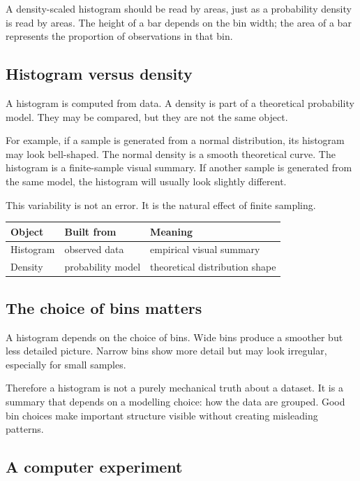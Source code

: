 \begin{remarkbox}
A density-scaled histogram should be read by areas, just as a probability density
is read by areas. The height of a bar depends on the bin width; the area of a bar
represents the proportion of observations in that bin.
\end{remarkbox}

\subsection*{Histogram versus density}

A histogram is computed from data. A density is part of a theoretical probability
model. They may be compared, but they are not the same object.

For example, if a sample is generated from a normal distribution, its histogram
may look bell-shaped. The normal density is a smooth theoretical curve. The
histogram is a finite-sample visual summary. If another sample is generated from
the same model, the histogram will usually look slightly different.

This variability is not an error. It is the natural effect of finite sampling.

\begin{center}
\begin{tabular}{lll}
\toprule
Object & Built from & Meaning \\
\midrule
Histogram & observed data & empirical visual summary \\
Density & probability model & theoretical distribution shape \\
\bottomrule
\end{tabular}
\end{center}

\subsection*{The choice of bins matters}

A histogram depends on the choice of bins. Wide bins produce a smoother but less
detailed picture. Narrow bins show more detail but may look irregular, especially
for small samples.

Therefore a histogram is not a purely mechanical truth about a dataset. It is a
summary that depends on a modelling choice: how the data are grouped. Good bin
choices make important structure visible without creating misleading patterns.

\subsection*{A computer experiment}

